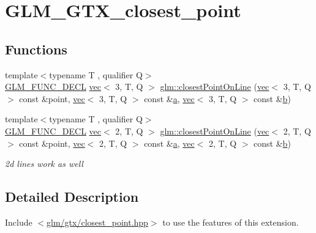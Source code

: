 \hypertarget{group__gtx__closest__point}{}\section{G\+L\+M\+\_\+\+G\+T\+X\+\_\+closest\+\_\+point}
\label{group__gtx__closest__point}
\subsection*{Functions}
\begin{DoxyCompactItemize}
\item 
{\footnotesize template$<$typename T , qualifier Q$>$ }\\\mbox{\hyperlink{setup_8hpp_ab2d052de21a70539923e9bcbf6e83a51}{G\+L\+M\+\_\+\+F\+U\+N\+C\+\_\+\+D\+E\+CL}} \mbox{\hyperlink{structglm_1_1vec}{vec}}$<$ 3, T, Q $>$ \mbox{\hyperlink{group__gtx__closest__point_ga36529c278ef716986151d58d151d697d}{glm\+::closest\+Point\+On\+Line}} (\mbox{\hyperlink{structglm_1_1vec}{vec}}$<$ 3, T, Q $>$ const \&point, \mbox{\hyperlink{structglm_1_1vec}{vec}}$<$ 3, T, Q $>$ const \&\mbox{\hyperlink{_s_d_l__opengl__glext_8h_a3309789fc188587d666cda5ece79cf82}{a}}, \mbox{\hyperlink{structglm_1_1vec}{vec}}$<$ 3, T, Q $>$ const \&\mbox{\hyperlink{_s_d_l__opengl__glext_8h_a0f71581a41fd2264c8944126dabbd010}{b}})
\item 
{\footnotesize template$<$typename T , qualifier Q$>$ }\\\mbox{\hyperlink{setup_8hpp_ab2d052de21a70539923e9bcbf6e83a51}{G\+L\+M\+\_\+\+F\+U\+N\+C\+\_\+\+D\+E\+CL}} \mbox{\hyperlink{structglm_1_1vec}{vec}}$<$ 2, T, Q $>$ \mbox{\hyperlink{group__gtx__closest__point_ga55bcbcc5fc06cb7ff7bc7a6e0e155eb0}{glm\+::closest\+Point\+On\+Line}} (\mbox{\hyperlink{structglm_1_1vec}{vec}}$<$ 2, T, Q $>$ const \&point, \mbox{\hyperlink{structglm_1_1vec}{vec}}$<$ 2, T, Q $>$ const \&\mbox{\hyperlink{_s_d_l__opengl__glext_8h_a3309789fc188587d666cda5ece79cf82}{a}}, \mbox{\hyperlink{structglm_1_1vec}{vec}}$<$ 2, T, Q $>$ const \&\mbox{\hyperlink{_s_d_l__opengl__glext_8h_a0f71581a41fd2264c8944126dabbd010}{b}})
\begin{DoxyCompactList}\small\item\em 2d lines work as well \end{DoxyCompactList}\end{DoxyCompactItemize}


\subsection{Detailed Description}
Include $<$\mbox{\hyperlink{closest__point_8hpp}{glm/gtx/closest\+\_\+point.\+hpp}}$>$ to use the features of this extension.

